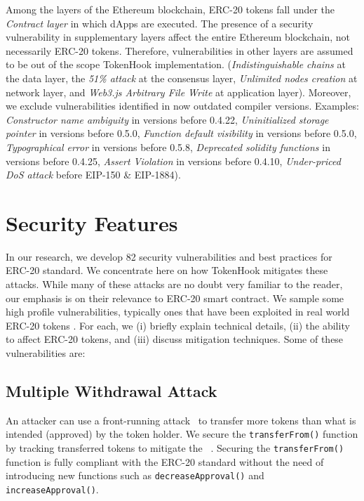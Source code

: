 Among the layers of the Ethereum blockchain, ERC-20 tokens fall under the \textit{Contract layer} in which dApps are executed. The presence of a security vulnerability in supplementary layers affect the entire Ethereum blockchain, not necessarily ERC-20 tokens. Therefore, vulnerabilities in other layers are assumed to be out of the scope TokenHook implementation. (\eg \textit{Indistinguishable chains} at the data layer, the \textit{51\% attack} at the consensus layer, \textit{Unlimited nodes creation} at network layer, and \textit{Web3.js Arbitrary File Write} at application layer). Moreover, we exclude vulnerabilities identified in now outdated compiler versions. Examples: \textit{Constructor name ambiguity} in versions before 0.4.22, \textit{Uninitialized storage pointer} in versions before 0.5.0, \textit{Function default visibility} in versions before 0.5.0, \textit{Typographical error} in versions before 0.5.8, \textit{Deprecated solidity functions} in versions before 0.4.25, \textit{Assert Violation} in versions before 0.4.10, \textit{Under-priced DoS attack} before EIP-150 \& EIP-1884).

\section{Security Features}
In our research, we develop 82 security vulnerabilities and best practices for ERC-20 standard. We concentrate here on how TokenHook mitigates these attacks. While many of these attacks are no doubt very familiar to the reader, our emphasis is on their relevance to ERC-20 smart contract. We sample some high profile vulnerabilities, typically ones that have been exploited in real world ERC-20 tokens \cite{SolidtySecBlog,EthSecServ,SoliditySecCon,ConsensysSecCon,LandoKL}. For each, we (i) briefly explain technical details, (ii) the ability to affect ERC-20 tokens, and (iii) discuss mitigation techniques. Some of these vulnerabilities are:

\subsection*{Multiple Withdrawal Attack} An attacker can use a front-running attack~\cite{OrderingAttack,eskandari2019sok} to transfer more tokens than what is intended (approved) by the token holder. We secure the \texttt{transferFrom()} function by tracking transferred tokens to mitigate the \mwa~\cite{MultipleWithdrawal}. Securing the \texttt{transferFrom()} function is fully compliant with the ERC-20 standard without the need of introducing new functions such as \texttt{decreaseApproval()} and \texttt{increaseApproval()}. 

